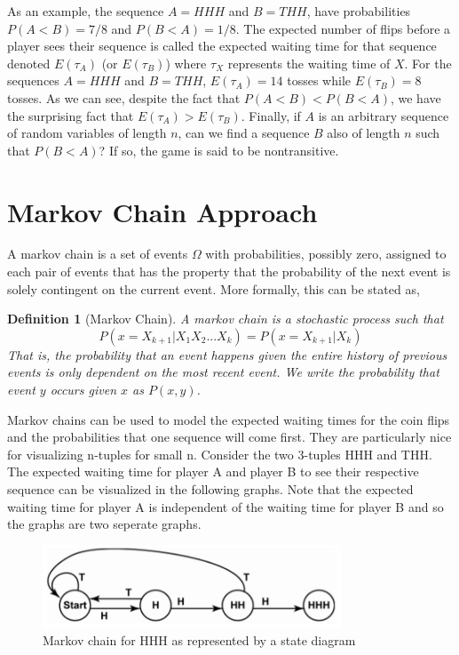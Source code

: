 \documentclass{article}
\newtheorem{definition}[theorem]{Definition}
\numberwithin{mytheorem}{subsection} %
\begin{document}
		As an example, the sequence $A = HHH$ and $B = THH$, have probabilities $P(A < B) = 7/8$ and $P(B < A) = 1/8$. The expected number of flips before a player sees their sequence is called the expected waiting time for that sequence denoted $E( \tau_A)$ (or $E(\tau_B)$) where $\tau_X$ represents the waiting time of $X$. For the sequences $A = HHH$ and $B = THH$, $E( \tau_A) = 14$ tosses while $E( \tau_B)=8$ tosses. As we can see, despite the fact that $P(A < B) < P(B < A)$, we have the surprising fact that $E( \tau_A) > E( \tau_B)$. Finally, if $A$ is an arbitrary sequence of random variables of length $n$, can we find a sequence $B$ also of length $n$ such that $P(B < A)$?  If so, the game is said to be nontransitive. 


	\section{Markov Chain Approach}
		A markov chain is a set of events $\Omega$ with probabilities, possibly zero, assigned to each pair of events that has the property that the probability of the next event is solely contingent on the current event. More formally, this can be stated as, 

		\begin{definition}[Markov Chain]
			A markov chain is a stochastic process such that $$P(x = X_{k+1} | X_1X_2...X_k) = P(x = X_{k+1} | X_k)$$ That is, the probability that an event happens given the entire history of previous events is only dependent on the most recent event. We write the probability that event $y$ occurs given $x$ as $P(x,y)$. \cite{textbook}
		\end{definition}

		Markov chains can be used to model the expected waiting times for the coin flips and the probabilities that one sequence will come first. They are particularly nice for visualizing n-tuples for small n. Consider the two 3-tuples HHH and THH. The expected waiting time for player A and player B to see their respective sequence can be visualized in the following graphs. Note that the expected waiting time for player A is independent of the waiting time for player B and so the graphs are two seperate graphs.

		\begin{figure}[h]
			\begin{center}
				\includegraphics[width=3.5in]{StateDiagramforHHH}
			\end{center}
		
			\caption{Markov chain for HHH as represented by a state diagram \cite{nickerson}}
			\label{perfect_fig}
		\end{figure}
\end{document}
